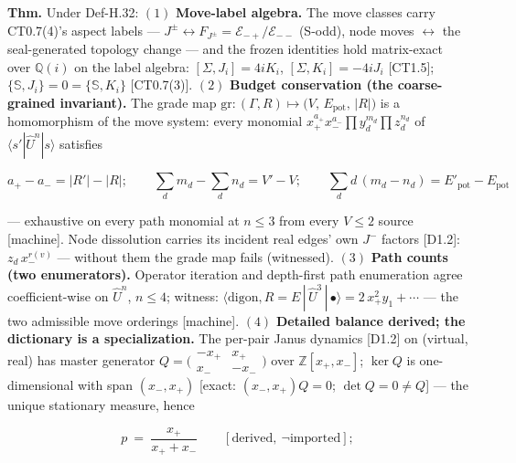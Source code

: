 \begin{theorem}\label{tag:FT-108}
\textbf{Thm.} Under Def-H.32: $(1)$ \textbf{Move-label algebra.} The move classes carry CT0.7(4)'s aspect labels — $J^\pm\leftrightarrow F_{J^\pm}=\mathcal E_{-+}/\mathcal E_{--}$ (S-odd), node moves $\leftrightarrow$ the seal-generated topology change — and the frozen identities hold matrix-exact over $\mathbb Q(i)$ on the label algebra: $[\Sigma,J_i]=4iK_i$, $[\Sigma,K_i]=-4iJ_i$ [CT1.5]; $\{\mathbb S,J_i\}=0=\{\mathbb S,K_i\}$ [CT0.7(3)]. $(2)$ \textbf{Budget conservation (the coarse-grained invariant).} The grade map $\mathrm{gr}:(\Gamma,R)\mapsto\bigl(V,\,E_{\mathrm{pot}},\,|R|\bigr)$ is a homomorphism of the move system: every monomial $x_+^{a_+}x_-^{a_-}\prod y_d^{m_d}\prod z_d^{n_d}$ of $\langle s'|\hat U^n|s\rangle$ satisfies

\[
a_+-a_-=|R'|-|R|;\qquad \textstyle\sum_d m_d-\sum_d n_d=V'-V;\qquad \sum_d d\,(m_d-n_d)=E'_{\mathrm{pot}}-E_{\mathrm{pot}}
\]

— exhaustive on every path monomial at $n\le3$ from every $V\le2$ source [machine]. Node dissolution carries its incident real edges' own $J^-$ factors [D1.2]: $z_d\,x_-^{r(v)}$ — without them the grade map fails (witnessed). $(3)$ \textbf{Path counts (two enumerators).} Operator iteration and depth-first path enumeration agree coefficient-wise on $\hat U^n$, $n\le4$; witness: $\langle\text{digon},R{=}E\,|\,\hat U^3\,|\,\bullet\rangle=2\,x_+^2y_1+\cdots$ — the two admissible move orderings [machine]. $(4)$ \textbf{Detailed balance derived; the dictionary is a specialization.} The per-pair Janus dynamics [D1.2] on (virtual, real) has master generator $Q=\bigl(\begin{smallmatrix}-x_+&x_+\\ x_-&-x_-\end{smallmatrix}\bigr)$ over $\mathbb Z[x_+,x_-]$; $\ker Q$ is one-dimensional with span $(x_-,x_+)$ [exact: $(x_-,x_+)Q=0$; $\det Q=0\ne Q$] — the unique stationary measure, hence

\[
p\ =\ \frac{x_+}{x_++x_-}\qquad[\text{derived},\ \neg\text{imported}];
\]


\end{theorem}
